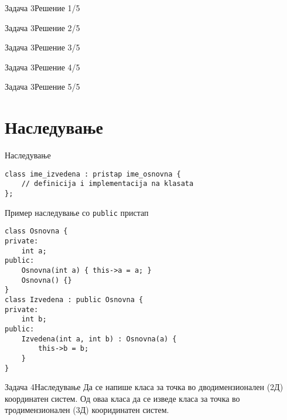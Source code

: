 \begin{frame}[fragile]{Задача 3}{Решение 1/5}

\end{frame}

\begin{frame}[fragile]{Задача 3}{Решение 2/5}

\end{frame}

\begin{frame}[fragile]{Задача 3}{Решение 3/5}

\end{frame}

\begin{frame}[fragile]{Задача 3}{Решение 4/5}

\end{frame}

\begin{frame}[fragile]{Задача 3}{Решение 5/5}

\end{frame}

\section{Наследување}

\begin{frame}[fragile]{Наследување}
\begin{lstlisting}
class ime_izvedena : pristap ime_osnovna {
    // definicija i implementacija na klasata
};
\end{lstlisting}
\begin{exampleblock}{Пример наследување со \texttt{public} пристап}
\begin{lstlisting}
class Osnovna {
private:
    int a;
public:
    Osnovna(int a) { this->a = a; }
    Osnovna() {}
}
class Izvedena : public Osnovna {
private:
    int b;
public:
    Izvedena(int a, int b) : Osnovna(a) {
        this->b = b;
    }
}
\end{lstlisting}
\end{exampleblock}
\end{frame}

\begin{frame}{Задача 4}{Наследување}
Да се напише класа за точка во дводимензионален (2Д) координатен систем. Од оваа
класа да се изведе класа за точка во тродимензионален (3Д) кооридинатен систем.
\end{frame}


